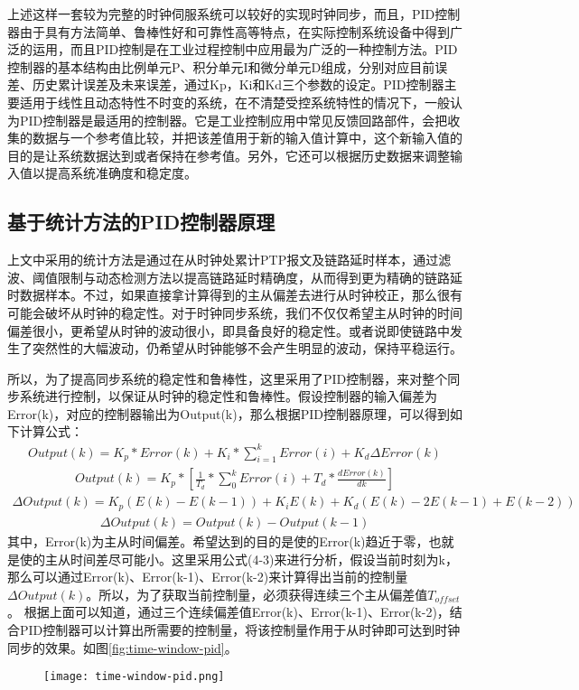 上述这样一套较为完整的时钟伺服系统可以较好的实现时钟同步，而且，PID控制器由于具有方法简单、鲁棒性好和可靠性高等特点，在实际控制系统设备中得到广泛的运用，而且PID控制是在工业过程控制中应用最为广泛的一种控制方法。PID控制器的基本结构由比例单元P、积分单元I和微分单元D组成，分别对应目前误差、历史累计误差及未来误差，通过Kp，Ki和Kd三个参数的设定。PID控制器主要适用于线性且动态特性不时变的系统，在不清楚受控系统特性的情况下，一般认为PID控制器是最适用的控制器。它是工业控制应用中常见反馈回路部件，会把收集的数据与一个参考值比较，并把该差值用于新的输入值计算中，这个新输入值的目的是让系统数据达到或者保持在参考值。另外，它还可以根据历史数据来调整输入值以提高系统准确度和稳定度。

\subsection{基于统计方法的PID控制器原理}
上文中采用的统计方法是通过在从时钟处累计PTP报文及链路延时样本，通过滤波、阈值限制与动态检测方法以提高链路延时精确度，从而得到更为精确的链路延时数据样本。不过，如果直接拿计算得到的主从偏差去进行从时钟校正，那么很有可能会破坏从时钟的稳定性。对于时钟同步系统，我们不仅仅希望主从时钟的时间偏差很小，更希望从时钟的波动很小，即具备良好的稳定性。或者说即使链路中发生了突然性的大幅波动，仍希望从时钟能够不会产生明显的波动，保持平稳运行。

所以，为了提高同步系统的稳定性和鲁棒性，这里采用了PID控制器，来对整个同步系统进行控制，以保证从时钟的稳定性和鲁棒性。假设控制器的输入偏差为Error(k)，对应的控制器输出为Output(k)，那么根据PID控制器原理，可以得到如下计算公式：
\begin {align}
Output(k) = K_{p} * Error(k) + K_{i} * \sum_{i=1}^{k}Error(i) + K_{d}\Delta Error(k)
\end{align}
\begin {align}
Output(k) = K_{p} * [\frac{1}{T_{d}} * \sum_{0}^{k}Error(i) + T_{d} * \frac{dError(k)}{dk}]
\end{align}
\begin {align}
\Delta Output(k) = K_{p}(E(k) - E(k-1)) + K_{i}E(k) + K_{d}(E(k) - 2E(k-1) + E(k-2))
\end{align}
\begin {align}
\Delta Output(k) = Output(k) - Output(k-1)
\end{align}
其中，Error(k)为主从时间偏差。希望达到的目的是使的Error(k)趋近于零，也就是使的主从时间差尽可能小。这里采用公式(4-3)来进行分析，假设当前时刻为k，那么可以通过Error(k)、Error(k-1)、Error(k-2)来计算得出当前的控制量$\Delta Output(k)$。所以，为了获取当前控制量，必须获得连续三个主从偏差值$T_{offset}$。
根据上面可以知道，通过三个连续偏差值Error(k)、Error(k-1)、Error(k-2)，结合PID控制器可以计算出所需要的控制量，将该控制量作用于从时钟即可达到时钟同步的效果。如图\ref{fig:time-window-pid}。
\begin{figure}[htbp]
  \centering
  \begin{minipage}[b]{0.7\textwidth}
   \captionstyle{\centering}
   \centering
   \texttt{[image: time-window-pid.png]}
  \end{minipage}     
\end{figure}

